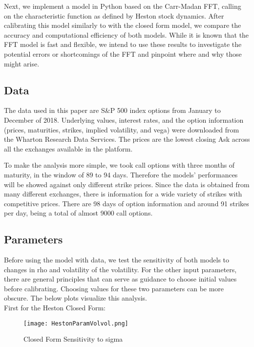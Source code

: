 \documentclass[fontsize=12pt]{article}
\numberwithin{equation}{section} %
\numberwithin{figure}{section} %
\numberwithin{table}{section} %
\begin{document}
	Next, we implement a model in Python based on the Carr-Madan FFT, calling on the characteristic function as defined by Heston stock dynamics. After calibrating this model similarly to with the closed form model, we compare the accuracy and computational efficiency of both models. While it is known that the FFT model is fast and flexible, we intend to use these results to investigate the potential errors or shortcomings of the FFT and pinpoint where and why those might arise. 


\subsection{Data} \label{Data}

	The data used in this paper are S\&P 500 index options from January to December of 2018. Underlying values, interest rates, and the option information (prices, maturities, strikes, implied volatility, and vega) were downloaded from the Wharton Research Data Services. The prices are the lowest closing Ask across all the exchanges available in the platform. 
	
	To make the analysis more simple, we took call options with three months of maturity, in the window of 89 to 94 days. Therefore the models' performances will be showed against only different strike prices. Since the data is obtained from many different exchanges, there is information for a wide variety of strikes with competitive prices. There are 98 days of option information and around 91 strikes per day, being a total of almost 9000 call options.


\subsection{Parameters} \label{Parameters}

	Before using the model with data, we test the sensitivity of both models to changes in rho and volatility of the volatility. For the other input parameters, there are general principles that can serve as guidance to choose initial values before calibrating. Choosing values for these two parameters can be more obscure. The below plots visualize this analysis. \\
	
	First for the Heston Closed Form:
\begin{figure}[H]
  \centering
   \texttt{[image: HestonParamVolvol.png]}
  \caption{Closed Form Sensitivity to sigma}
  \label{fig:CF sensitivity}
\end{figure}
\end{document}
